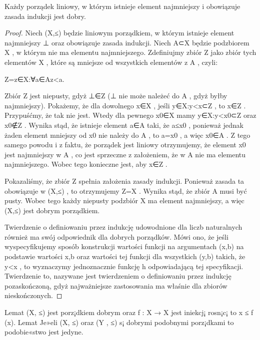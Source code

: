 \begin{theorem}
    Każdy porządek liniowy, w którym istnieje element najmniejszy i obowiązuje zasada indukcji jest dobry.
\end{theorem}
\begin{proof}
    Niech (X,≤)
 będzie liniowym porządkiem, w którym istnieje element najmniejszy ⊥
 oraz obowiązuje zasada indukcji. Niech A⊂X
 będzie podzbiorem X
, w którym nie ma elementu najmniejszego. Zdefiniujmy zbiór Z
 jako zbiór tych elementów X
, które są mniejsze od wszystkich elementów z A
, czyli:

Z={z∈X:∀a∈Az<a}.

Zbiór Z
 jest niepusty, gdyż ⊥∈Z
 (⊥
 nie może należeć do A
, gdyż byłby najmniejszy). Pokażemy, że dla dowolnego x∈X
, jeśli {y∈X:y<x}⊂Z
, to x∈Z
. Przypuśćmy, że tak nie jest. Wtedy dla pewnego x0∈X
 mamy {y∈X:y<x0}⊂Z
 oraz x0∉Z
. Wynika stąd, że istnieje element a∈A
 taki, że a≤x0
, ponieważ jednak żaden element mniejszy od x0
 nie należy do A
, to a=x0
, a więc x0∈A
. Z tego samego powodu i z faktu, że porządek jest liniowy otrzymujemy, że element x0
 jest najmniejszy w A
, co jest sprzeczne z założeniem, że w A
 nie ma elementu najmniejszego. Wobec tego konieczne jest, aby x∈Z
.

Pokazaliśmy, że zbiór Z
 spełnia założenia zasady indukcji. Ponieważ zasada ta obowiązuje w (X,≤)
, to otrzymujemy Z=X
. Wynika stąd, że zbiór A
 musi być pusty. Wobec tego każdy niepusty podzbiór X
 ma element najmniejszy, a więc (X,≤)
 jest dobrym porządkiem.

Twierdzenie o definiowaniu przez indukcję udowodnione dla liczb naturalnych również ma swój odpowiednik dla dobrych porządków. Mówi ono, że jeśli wyspecyfikujemy sposób konstrukcji wartości funkcji na argumentach (x,b)
 na podstawie wartości x,b
 oraz wartości tej funkcji dla wszystkich (y,b)
 takich, że y<x
, to wyznaczymy jednoznacznie funkcję h
 odpowiadającą tej specyfikacji. Twierdzenie to, nazywane jest twierdzeniem o definiowaniu przez indukcję pozaskończoną, gdyż najważniejsze zastosowania ma właśnie dla zbiorów nieskończonych.
\end{proof}

Lemat
(X, ≤) jest porz¡dkiem dobrym oraz f : X → X jest iniekcj¡ rosn¡c¡
to x ≤ f (x).
Lemat
Je»eli (X, ≤) oraz (Y , ≤) s¡ dobrymi podobnymi porz¡dkami to
podobie«stwo jest jedyne.
